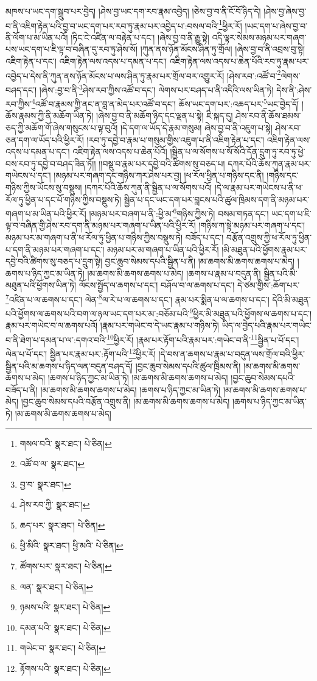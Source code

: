 མཁས་པ་ཡང་དག་སྒྲུབ་པར་བྱེད། །ཤེས་བྱ་ཡང་དག་རབ་རྣམ་འབྱེད། །ཅེས་བྱ་བ་ནི་ངོ་བོ་ཉིད་དེ། །ཤེས་བྱ་ཞེས་བྱ་བ་ནི་འཇིག་རྟེན་པའི་བྱ་བ་ཡང་དག་པར་རབ་ཏུ་རྣམ་པར་འབྱེད་པ་:བསལ་བའི་\footnote{གསལ་བའི་  སྣར་ཐང་།  པེ་ཅིན། }ཕྱིར་རོ། །ཡང་དག་པ་ཞེས་བྱ་བ་ནི་ལོག་པ་མ་ཡིན་པའོ། །ཏིང་ངེ་འཛིན་ལ་བརྟེན་པ་དང་། །ཞེས་བྱ་བ་ནི་རྒྱུ་སྟེ། འདི་ལྟར་སེམས་མཉམ་པར་གཞག་པས་ཡང་དག་པ་ཇི་ལྟ་བ་བཞིན་དུ་རབ་ཏུ་ཤེས་སོ། །ཀུན་ནས་ཉོན་མོངས་ཤིན་ཏུ་གྲོལ། །ཞེས་བྱ་བ་ནི་འབྲས་བུ་སྟེ། འཇིག་རྟེན་པ་དང་། འཇིག་རྟེན་ལས་འདས་པ་དམན་པ་དང་། འཇིག་རྟེན་ལས་འདས་པ་ཆེན་པོའི་རབ་ཏུ་རྣམ་པར་འབྱེད་པ་དེས་ནི་ཀུན་ནས་ཉོན་མོངས་པ་ལས་ཤིན་ཏུ་རྣམ་པར་གྲོལ་བར་འགྱུར་རོ། །ཤེས་རབ་:འཚོ་བ་\footnote{འཚོ་བ་ལ་  སྣར་ཐང་། }ལེགས་བཤད་དང་། །ཞེས་:བྱ་བ་ནི་\footnote{བྱ་བ་  སྣར་ཐང་། }ཤེས་རབ་ཀྱིས་འཚོ་བ་དང་། ལེགས་པར་བཤད་པ་ནི་འདིའི་ལས་ཡིན་ཏེ། དེས་ནི་:ཤེས་རབ་ཀྱིས་\footnote{ཤེས་རབ་ཀྱི་  སྣར་ཐང་། }འཚོ་བ་རྣམས་ཀྱི་ནང་ན་བླ་ན་མེད་པར་འཚོ་བ་དང་། ཆོས་ཡང་དག་པར་:འཆད་པར་\footnote{ཆད་པར་  སྣར་ཐང་།  པེ་ཅིན། }ཡང་བྱེད་དོ། །ཆོས་རྣམས་ཀྱི་ནི་མཆོག་ཡིན་ཏེ། །ཞེས་བྱ་བ་ནི་མཆོག་ཉིད་དང་ལྡན་པ་སྟེ། ཇི་སྐད་དུ། ཤེས་རབ་ནི་ཆོས་ཐམས་ཅད་ཀྱི་མཆོག་གོ་ཞེས་གསུངས་པ་ལྟ་བུའོ། །དེ་དག་ལ་ཡོད་དེ་རྣམ་གསུམ། ཞེས་བྱ་བ་ནི་འཇུག་པ་སྟེ། ཤེས་རབ་ཅན་དག་ལ་ཡོད་པའི་ཕྱིར་རོ། །རབ་ཏུ་དབྱེ་བ་རྣམ་པ་གསུམ་གྱིས་འཇུག་པ་ནི་འཇིག་རྟེན་པ་དང་། འཇིག་རྟེན་ལས་འདས་པ་དམན་པ་དང་། འཇིག་རྟེན་ལས་འདས་པ་ཆེན་པོའོ། །སྦྱིན་པ་ལ་སོགས་པ་སོ་སོའི་དོན་དྲུག་ཏུ་རབ་ཏུ་ཕྱེ་བས་རབ་ཏུ་དབྱེ་བ་བཤད་ཟིན་ཏོ།། །།བསྡུ་བ་རྣམ་པར་དབྱེ་བའི་ཚིགས་སུ་བཅད་པ། དཀར་པོའི་ཆོས་ཀུན་རྣམ་པར་གཡེངས་པ་དང་། །མཉམ་པར་གཞག་དང་གཉིས་ཀར་ཤེས་པར་བྱ། །ཕ་རོལ་ཕྱིན་པ་གཉིས་དང་ནི། །གཉིས་དང་གཉིས་ཀྱིས་ཡོངས་སུ་བསྡུས། །དཀར་པོའི་ཆོས་ཀུན་ནི་སྦྱིན་པ་ལ་སོགས་པའོ། །དེ་ལ་རྣམ་པར་གཡེངས་པ་ནི་ཕ་རོལ་ཏུ་ཕྱིན་པ་དང་པོ་གཉིས་ཀྱིས་བསྡུས་ཏེ། སྦྱིན་པ་དང་ཡང་དག་པར་བླངས་པའི་ཚུལ་ཁྲིམས་དག་ནི་མཉམ་པར་གཞག་པ་མ་ཡིན་པའི་ཕྱིར་རོ། །མཉམ་པར་བཞག་པ་ནི་:ཕྱི་མ་\footnote{ཕྱི་མིའི་  སྣར་ཐང་། ཕྱི་མའི་  པེ་ཅིན། }གཉིས་ཀྱིས་ཏེ། བསམ་གཏན་དང་། ཡང་དག་པ་ཇི་ལྟ་བ་བཞིན་གྱི་ཤེས་རབ་དག་ནི་མཉམ་པར་གཞག་པ་ཡིན་པའི་ཕྱིར་རོ། །གཉིས་ཀ་སྟེ་མཉམ་པར་གཞག་པ་དང་། མཉམ་པར་མ་གཞག་པ་ནི་ཕ་རོལ་ཏུ་ཕྱིན་པ་གཉིས་ཀྱིས་བསྡུས་ཏེ། བཟོད་པ་དང་། བརྩོན་འགྲུས་ཀྱི་ཕ་རོལ་ཏུ་ཕྱིན་པ་དག་ནི་མཉམ་པར་གཞག་པ་དང་། མཉམ་པར་མ་གཞག་པ་ཡིན་པའི་ཕྱིར་རོ། །མི་མཐུན་པའི་ཕྱོགས་རྣམ་པར་དབྱེ་བའི་ཚིགས་སུ་བཅད་པ་དྲུག་སྟེ། བྱང་ཆུབ་སེམས་དཔའི་སྦྱིན་པ་ནི། །མ་ཆགས་མི་ཆགས་ཆགས་པ་མེད། །ཆགས་པ་ཉིད་ཀྱང་མ་ཡིན་ཏེ། །མ་ཆགས་མི་ཆགས་ཆགས་པ་མེད། །ཆགས་པ་རྣམ་པ་བདུན་ནི། སྦྱིན་པའི་མི་མཐུན་པའི་ཕྱོགས་ཡིན་ཏེ། ལོངས་སྤྱོད་ལ་ཆགས་པ་དང་། བཤོལ་བ་ལ་ཆགས་པ་དང་། དེ་ཙམ་གྱིས་:ཆོག་པར་\footnote{ཚོགས་པར་  སྣར་ཐང་།  པེ་ཅིན། }འཛིན་པ་ལ་ཆགས་པ་དང་། ལེན་\footnote{ལན་  སྣར་ཐང་།  པེ་ཅིན། }ལ་རེ་པ་ལ་ཆགས་པ་དང་། རྣམ་པར་སྨིན་པ་ལ་ཆགས་པ་དང་། དེའི་མི་མཐུན་པའི་ཕྱོགས་ལ་ཆགས་པའི་བག་ལ་ཉལ་ཡང་དག་པར་མ་:བཅོམ་པའི་\footnote{ཉམས་པའི་  སྣར་ཐང་།  པེ་ཅིན། }ཕྱིར་མི་མཐུན་པའི་ཕྱོགས་ལ་ཆགས་པ་དང་། རྣམ་པར་གཡེང་བ་ལ་ཆགས་པའོ། །རྣམ་པར་གཡེང་བ་དེ་ཡང་རྣམ་པ་གཉིས་ཏེ། ཡིད་ལ་བྱེད་པའི་རྣམ་པར་གཡེང་བ་ནི་ཐེག་པ་དམན་པ་ལ་:དགའ་བའི་\footnote{དམན་པའི་  སྣར་ཐང་།  པེ་ཅིན། }ཕྱིར་རོ། །རྣམ་པར་རྟོག་པའི་རྣམ་པར་:གཡེང་བ་ནི་\footnote{གཡེང་བ་  སྣར་ཐང་།  པེ་ཅིན། }སྦྱིན་པ་པོ་དང་། ལེན་པ་པོ་དང་། སྦྱིན་པར་རྣམ་པར་:རྟོག་པའི་\footnote{རྟོགས་པའི་  སྣར་ཐང་།  པེ་ཅིན། }ཕྱིར་རོ། །དེ་བས་ན་ཆགས་པ་རྣམ་པ་བདུན་ལས་གྲོལ་བའི་ཕྱིར་སྦྱིན་པའི་མ་ཆགས་པ་ཉིད་ལན་བདུན་བཤད་དོ། །བྱང་ཆུབ་སེམས་དཔའི་ཚུལ་ཁྲིམས་ནི། །མ་ཆགས་མི་ཆགས་ཆགས་པ་མེད། །ཆགས་པ་ཉིད་ཀྱང་མ་ཡིན་ཏེ། །མ་ཆགས་མི་ཆགས་ཆགས་པ་མེད། །བྱང་ཆུབ་སེམས་དཔའི་བཟོད་པ་ནི། །མ་ཆགས་མི་ཆགས་ཆགས་པ་མེད། །ཆགས་པ་ཉིད་ཀྱང་མ་ཡིན་ཏེ། །མ་ཆགས་མི་ཆགས་ཆགས་པ་མེད། །བྱང་ཆུབ་སེམས་དཔའི་བརྩོན་འགྲུས་ནི། །མ་ཆགས་མི་ཆགས་ཆགས་པ་མེད། །ཆགས་པ་ཉིད་ཀྱང་མ་ཡིན་ཏེ། །མ་ཆགས་མི་ཆགས་ཆགས་པ་མེད། 